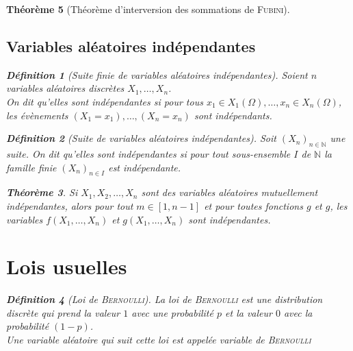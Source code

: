 \documentclass[11pt,a4paper]{report}
\newtheorem{theorem}{Théorème}[chapter]
\theoremstyle{definition}
\newtheorem{dfn}[theorem]{Définition}
\begin{document}
\begin{theorem}[Théorème d'interversion des sommations de \textsc{Fubini}]
{{\subsection{Variables aléatoires indépendantes} %
 \label{sub:variables_aleatoires_independantes}
\begin{dfn}[Suite finie de variables aléatoires indépendantes]
      Soient $n$ variables aléatoires discrètes $X_1,\ldots, X_n$.\\ 
      On dit qu'elles sont \emph{indépendantes} si pour tous $x_1\in X_1(\Omega),\ldots,x_n\in X_n(\Omega)$, les évènements $(X_1 = x_1),\ldots ,(X_n = x_n)$ sont indépendants. 
 \end{dfn}
\begin{dfn}[Suite de variables aléatoires indépendantes]
      Soit $(X_n)_{n\in \mathbb{N}}$ une suite. On dit qu'elles sont \emph{indépendantes} si pour tout sous-ensemble $I$ de $\mathbb{N}$ la famille finie $(X_n)_{n\in I}$ est indépendante. 
 \end{dfn}
\begin{theorem}
      Si $X_1,X_2,\ldots ,X_n$ sont des variables aléatoires mutuellement indépendantes, alors pour tout $m \in [1, n-1 ]$ et pour toutes fonctions $g$ et $g$, les variables $f(X_1,\ldots ,X_n)$ et $g(X_1,\ldots ,X_n)$ sont indépendantes.
 \end{theorem}


\section{Lois usuelles} %
\label{sec:lois_usuelles}
\begin{dfn}[Loi de \textsc{Bernoulli}]
     La \emph{loi de \textsc{Bernoulli}} est une distribution discrète qui prend la valeur $1$ avec une probabilité $p$ et la valeur $0$ avec la probabilité $(1-p)$. \\
     Une variable aléatoire qui suit cette loi est appelée variable de \textsc{Bernoulli}
\end{dfn}
}}
\end{theorem}
\end{document}
